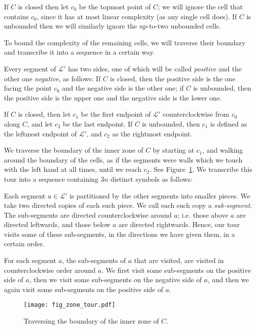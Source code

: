 \documentclass[11pt]{article}
\theoremstyle{definition}
\theoremstyle{remark}
\begin{document}
If $C$ is closed then let $c_0$ be the topmost point of $C$; we will ignore the cell that contains $c_0$, since it has at most linear complexity (as any single cell does). If $C$ is unbounded then we will similarly ignore the up-to-two unbounded cells.

To bound the complexity of the remaining cells, we will traverse their boundary and transcribe it into a sequence in a certain way.

Every segment of $\mathcal L'$ has two sides, one of which will be called \emph{positive} and the other one \emph{negative}, as follows: If $C$ is closed, then the positive side is the one facing the point $c_0$ and the negative side is the other one; if $C$ is unbounded, then the positive side is the upper one and the negative side is the lower one.

If $C$ is closed, then let $c_1$ be the first endpoint of $\mathcal L'$ counterclockwise from $c_0$ along $C$, and let $c_2$ be the last endpoint. If $C$ is unbounded, then $c_1$ is defined as the leftmost endpoint of $\mathcal L'$, and $c_2$ as the rightmost endpoint.

We traverse the boundary of the inner zone of $C$ by starting at $c_1$, and walking around the boundary of the cells, as if the segments were walls which we touch with the left hand at all times, until we reach $c_2$. See Figure~\ref{fig_zone_tour}. We transcribe this tour into a sequence containing $3n$ distinct symbols as follows:

Each segment $a\in \mathcal L'$ is partitioned by the other segments into smaller pieces. We take two directed copies of each such piece. We call each such copy a \emph{sub-segment}. The sub-segments are directed counterclockwise around $a$; i.e. those above $a$ are directed leftwards, and those below $a$ are directed rightwards. Hence, our tour visits some of these sub-segments, in the directions we have given them, in a certain order.

For each segment $a$, the sub-segments of $a$ that are visited, are visited in counterclockwise order around $a$. We first visit some sub-segments on the positive side of $a$, then we visit some sub-segments on the negative side of $a$, and then we again visit some sub-segments on the positive side of $a$.

\begin{figure}
\centerline{\texttt{[image: fig\_zone\_tour.pdf]}}
\caption{\label{fig_zone_tour}Traversing the boundary of the inner zone of $C$.}
\end{figure}
\end{document}
